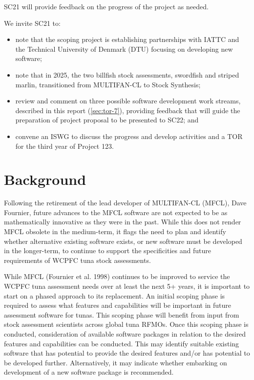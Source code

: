 \documentclass{SCreport}
\begin{document}
SC21 will provide feedback on the progress of the project as needed.

We invite SC21 to:\\[-4ex]

\begin{itemize}
  \item note that the scoping project is establishing partnerships with IATTC
  and the Technical University of Denmark (DTU) focusing on developing new
  software;\\[-4.5ex]
  \item note that in 2025, the two billfish stock assessments, swordfish and
  striped marlin, transitioned from MULTIFAN-CL to Stock Synthesis;\\[-4.5ex]
  \item review and comment on three possible software development work streams,
  described in this report (\autoref{sec:tor-7}), providing feedback that will
  guide the preparation of project proposal to be presented to SC22;
  and\\[-4.5ex]
  \item convene an ISWG to discuss the progress and develop activities and a TOR
  for the third year of Project 123.
\end{itemize}

\section{Background}

Following the retirement of the lead developer of MULTIFAN-CL (MFCL), Dave
Fournier, future advances to the MFCL software are not expected to be as
mathematically innovative as they were in the past. While this does not render
MFCL obsolete in the medium-term, it flags the need to plan and identify whether
alternative existing software exists, or new software must be developed in the
longer-term, to continue to support the specificities and future requirements of
WCPFC tuna stock assessments.

While MFCL (Fournier et al. 1998) continues to be improved to service the WCPFC
tuna assessment needs over at least the next 5+ years, it is important to start
on a phased approach to its replacement. An initial scoping phase is required to
assess what features and capabilities will be important in future assessment
software for tunas. This scoping phase will benefit from input from stock
assessment scientists across global tuna RFMOs. Once this scoping phase is
conducted, consideration of available software packages in relation to the
desired features and capabilities can be conducted. This may identify suitable
existing software that has potential to provide the desired features and/or has
potential to be developed further. Alternatively, it may indicate whether
embarking on development of a new software package is recommended.
\end{document}
